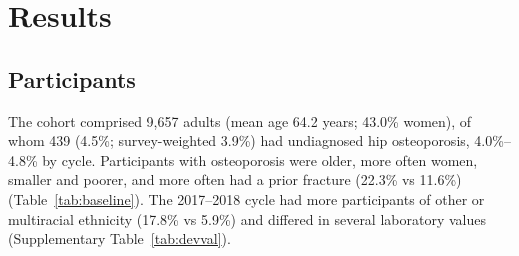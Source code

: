 \documentclass[11pt,a4paper]{article}
\begin{document}
\section{Results}

\subsection{Participants}
The cohort comprised 9,657 adults (mean age 64.2 years; 43.0\% women), of whom 439 (4.5\%; survey-weighted 3.9\%) had undiagnosed hip osteoporosis, 4.0\%--4.8\% by cycle. Participants with osteoporosis were older, more often women, smaller and poorer, and more often had a prior fracture (22.3\% vs 11.6\%) (Table~\ref{tab:baseline}). The 2017--2018 cycle had more participants of other or multiracial ethnicity (17.8\% vs 5.9\%) and differed in several laboratory values (Supplementary Table~\ref{tab:devval}).
\end{document}

